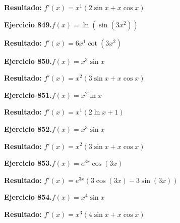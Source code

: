 \documentclass[10pt,a4paper]{article}
\begin{document}
\begin{solbox}
\textbf{Resultado:} \(\displaystyle f'(x) = x^{1}(2\sin x + x\cos x)\)
\end{solbox}

\begin{ejbox}
\textbf{Ejercicio 849.}\quad $f(x) = \ln(\sin(3x^{2}))$
\end{ejbox}

\begin{solbox}
\textbf{Resultado:} \(\displaystyle f'(x) = 6x^{1}\cot(3x^{2})\)
\end{solbox}

\newpage
\begin{ejbox}
\textbf{Ejercicio 850.}\quad $f(x) = x^{3} \sin x$
\end{ejbox}

\begin{solbox}
\textbf{Resultado:} \(\displaystyle f'(x) = x^{2}(3\sin x + x\cos x)\)
\end{solbox}

\begin{ejbox}
\textbf{Ejercicio 851.}\quad $f(x) = x^{2} \ln x$
\end{ejbox}

\begin{solbox}
\textbf{Resultado:} \(\displaystyle f'(x) = x^{1}(2\ln x + 1)\)
\end{solbox}

\begin{ejbox}
\textbf{Ejercicio 852.}\quad $f(x) = x^{3} \sin x$
\end{ejbox}

\begin{solbox}
\textbf{Resultado:} \(\displaystyle f'(x) = x^{2}(3\sin x + x\cos x)\)
\end{solbox}

\newpage
\begin{ejbox}
\textbf{Ejercicio 853.}\quad $f(x) = e^{3x} \cos(3x)$
\end{ejbox}

\begin{solbox}
\textbf{Resultado:} \(\displaystyle f'(x) = e^{3x}(3\cos(3x) - 3\sin(3x))\)
\end{solbox}

\begin{ejbox}
\textbf{Ejercicio 854.}\quad $f(x) = x^{4} \sin x$
\end{ejbox}

\begin{solbox}
\textbf{Resultado:} \(\displaystyle f'(x) = x^{3}(4\sin x + x\cos x)\)
\end{solbox}
\end{document}
